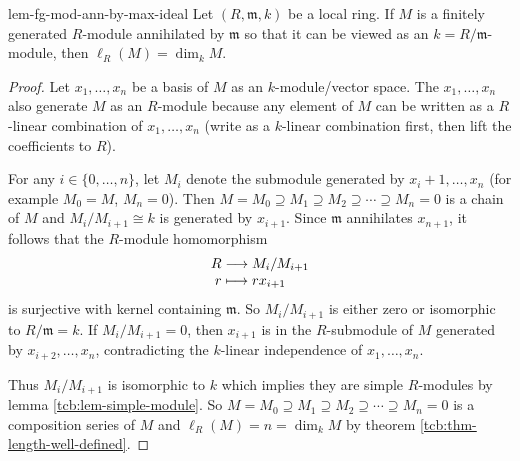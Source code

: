 \documentclass[a4paper,10pt]{article}
\theoremstyle{definition}
\newcommand\lref[2][blue!60!black]{lemma \ref{tcb:#2}}
\newcommand\tref[2][blue!60!black]{theorem \ref{tcb:#2}}
\begin{document}
\begin{lemma}{}{lem-fg-mod-ann-by-max-ideal}
Let $(R,\mathfrak{m},k)$ be a local ring.
If $M$ is a finitely generated $R$-module annihilated by $\mathfrak{m}$
so that it can be viewed as an $k=R/\mathfrak{m}$-module, 
then $\ell_R(M)=\dim_kM$.
\end{lemma}
\begin{proof}
Let $x_1,\dots,x_n$ be a basis of $M$ as an $k$-module/vector space.
The $x_1,\dots,x_n$ also generate $M$ as an $R$-module because any element 
of $M$ can be written as a $R$-linear combination of $x_1,\dots,x_n$
(write as a $k$-linear combination first, then lift the coefficients to $R$).

For any $i\in\{0,\dots,n\}$, let $M_i$ denote the 
submodule generated by $x_i+1,\dots,x_n$ (for example $M_0=M$, $M_n=0$).
Then $M=M_0\supseteq M_1\supseteq M_2\supseteq\cdots\supseteq M_n=0$ 
is a chain of $M$ and $M_i/M_{i+1}\cong k$ is generated by $x_{i+1}$.
Since $\mathfrak{m}$ annihilates $x_{n+1}$,
it follows that the $R$-module homomorphism 
\begin{equation*}\begin{array}{r@{}c@{}l}
R&{}\longrightarrow{}& M_i/M_{i+1} \\
r&{}\longmapsto{}& rx_{i+1}
\end{array}\end{equation*} 
is surjective with kernel containing $\mathfrak{m}$.
So $M_i/M_{i+1}$ is either zero or isomorphic to $R/\mathfrak{m}=k$.
If $M_i/M_{i+1}=0$, then $x_{i+1}$ is in the $R$-submodule of 
$M$ generated by $x_{i+2},\dots,x_n$,
contradicting the $k$-linear independence of $x_1,\dots,x_n$.

Thus $M_i/M_{i+1}$ is isomorphic to $k$ which implies
they are simple $R$-modules by \lref{lem-simple-module}.
So $M=M_0\supseteq M_1\supseteq M_2\supseteq\cdots\supseteq M_n=0$
is a composition series of $M$ and $\ell_R(M)=n=\dim_kM$
by \tref{thm-length-well-defined}.
\end{proof}
\end{document}
